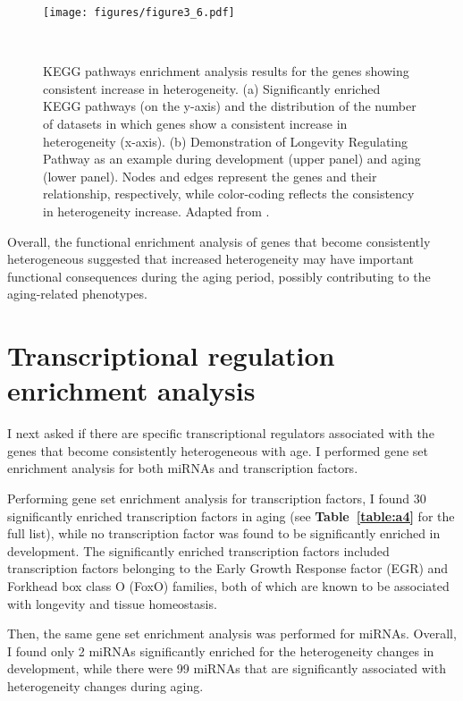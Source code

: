 \begin{figure}[!ht]
    \centering
    \texttt{[image: figures/figure3\_6.pdf]}
    \caption{KEGG pathways enrichment analysis results for the genes showing consistent increase in heterogeneity.
    (a) Significantly enriched KEGG pathways (on the y-axis) and the distribution of the number of datasets in which genes show a consistent increase in heterogeneity (x-axis). 
    (b) Demonstration of Longevity Regulating Pathway as an example during development (upper panel) and aging (lower panel). 
    Nodes and edges represent the genes and their relationship, respectively, while color-coding reflects the consistency in heterogeneity increase.
    Adapted from \autocite{Isildak2020}.
    }~\label{fig:fig3.6}
\end{figure}

Overall, the functional enrichment analysis of genes that become consistently heterogeneous suggested that 
increased heterogeneity may have important functional consequences during the aging period, possibly contributing to the aging-related phenotypes.

\section{Transcriptional regulation enrichment analysis}
I next asked if there are specific transcriptional regulators associated with the genes that become consistently heterogeneous with age.
I performed gene set enrichment analysis for both miRNAs and transcription factors.

Performing gene set enrichment analysis for transcription factors, 
I found 30 significantly enriched transcription factors in aging (see \textbf{Table~\ref{table:a4}} for the full list),
while no transcription factor was found to be significantly enriched in development. 
The significantly enriched transcription factors included transcription factors belonging to the Early Growth Response factor (EGR) and Forkhead box class O (FoxO) families,
both of which are known to be associated with longevity and tissue homeostasis. 

Then, the same gene set enrichment analysis was performed for miRNAs. 
Overall, I found only 2 miRNAs significantly enriched for the heterogeneity changes in development, 
while there were 99 miRNAs that are significantly associated with heterogeneity changes during aging.


